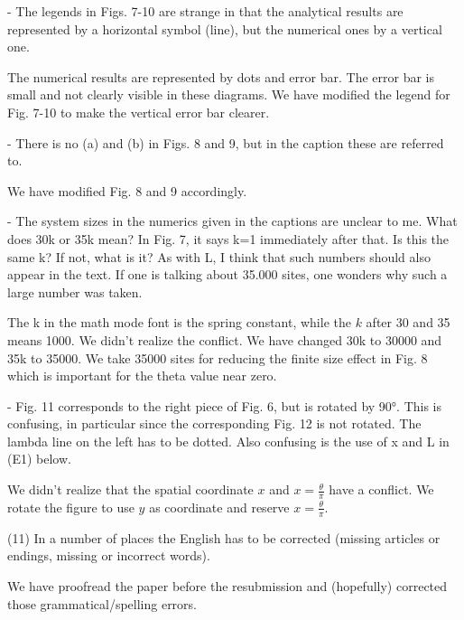 \documentclass{article}
\newcommand{\reply}[1]{{\color{black}#1}}
\begin{document}
- The legends in Figs. 7-10 are strange in that the analytical results are represented by a horizontal symbol (line), but the numerical ones by a vertical one.

\reply{The numerical results are represented by dots and error bar. The error bar is small and not clearly visible in these diagrams. We have modified the legend for Fig. 7-10 to make the vertical error bar clearer.}

- There is no (a) and (b) in Figs. 8 and 9, but in the caption these are referred to.

\reply{We have modified Fig. 8 and 9 accordingly.}

- The system sizes in the numerics given in the captions are unclear to me. What does 30k or 35k mean? In Fig. 7, it says k=1 immediately after that. Is this the same k? If not, what is it? As with L, I think that such numbers should also appear in the text. If one is talking about 35.000 sites, one wonders why such a large number was taken.

\reply{The k in the math mode font is the spring constant, while the $k$ after 30 and 35 means 1000. We didn't realize the conflict. We have changed 30k to 30000 and 35k to 35000. We take 35000 sites for reducing the finite size effect in Fig. 8 which is important for the theta value near zero. }

- Fig. 11 corresponds to the right piece of Fig. 6, but is rotated by 90°. This is confusing, in particular since the corresponding Fig. 12 is not rotated. The lambda line on the left has to be dotted. Also confusing is the use of x and L in (E1) below.

\reply{We didn't realize that the spatial coordinate $x$ and $x = \frac{\theta}{\pi}$ have a conflict. We rotate the figure to use $y$ as coordinate and reserve $x = \frac{\theta}{\pi}$. }
 
(11) In a number of places the English has to be corrected (missing articles or endings, missing or incorrect words).

\reply{We have proofread the paper before the resubmission and (hopefully) corrected those grammatical/spelling errors.}
\end{document}
